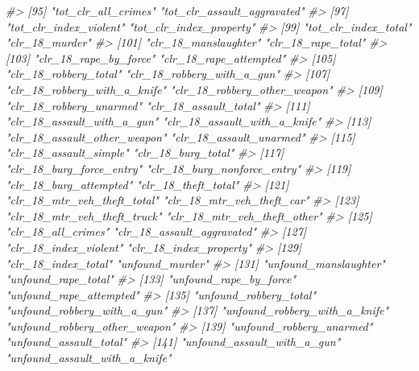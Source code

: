 \documentclass[
  12pt,
]{book}
\newenvironment{Shaded}{\begin{snugshade}}{\end{snugshade}}
\newcommand{\CommentTok}[1]{\textcolor[rgb]{0.37,0.37,0.37}{\textit{#1}}}
\begin{document}
\begin{Shaded}
\begin{Highlighting}[]
\CommentTok{\#\textgreater{}  [95] "tot\_clr\_all\_crimes"             "tot\_clr\_assault\_aggravated"    }
\CommentTok{\#\textgreater{}  [97] "tot\_clr\_index\_violent"          "tot\_clr\_index\_property"        }
\CommentTok{\#\textgreater{}  [99] "tot\_clr\_index\_total"            "clr\_18\_murder"                 }
\CommentTok{\#\textgreater{} [101] "clr\_18\_manslaughter"            "clr\_18\_rape\_total"             }
\CommentTok{\#\textgreater{} [103] "clr\_18\_rape\_by\_force"           "clr\_18\_rape\_attempted"         }
\CommentTok{\#\textgreater{} [105] "clr\_18\_robbery\_total"           "clr\_18\_robbery\_with\_a\_gun"     }
\CommentTok{\#\textgreater{} [107] "clr\_18\_robbery\_with\_a\_knife"    "clr\_18\_robbery\_other\_weapon"   }
\CommentTok{\#\textgreater{} [109] "clr\_18\_robbery\_unarmed"         "clr\_18\_assault\_total"          }
\CommentTok{\#\textgreater{} [111] "clr\_18\_assault\_with\_a\_gun"      "clr\_18\_assault\_with\_a\_knife"   }
\CommentTok{\#\textgreater{} [113] "clr\_18\_assault\_other\_weapon"    "clr\_18\_assault\_unarmed"        }
\CommentTok{\#\textgreater{} [115] "clr\_18\_assault\_simple"          "clr\_18\_burg\_total"             }
\CommentTok{\#\textgreater{} [117] "clr\_18\_burg\_force\_entry"        "clr\_18\_burg\_nonforce\_entry"    }
\CommentTok{\#\textgreater{} [119] "clr\_18\_burg\_attempted"          "clr\_18\_theft\_total"            }
\CommentTok{\#\textgreater{} [121] "clr\_18\_mtr\_veh\_theft\_total"     "clr\_18\_mtr\_veh\_theft\_car"      }
\CommentTok{\#\textgreater{} [123] "clr\_18\_mtr\_veh\_theft\_truck"     "clr\_18\_mtr\_veh\_theft\_other"    }
\CommentTok{\#\textgreater{} [125] "clr\_18\_all\_crimes"              "clr\_18\_assault\_aggravated"     }
\CommentTok{\#\textgreater{} [127] "clr\_18\_index\_violent"           "clr\_18\_index\_property"         }
\CommentTok{\#\textgreater{} [129] "clr\_18\_index\_total"             "unfound\_murder"                }
\CommentTok{\#\textgreater{} [131] "unfound\_manslaughter"           "unfound\_rape\_total"            }
\CommentTok{\#\textgreater{} [133] "unfound\_rape\_by\_force"          "unfound\_rape\_attempted"        }
\CommentTok{\#\textgreater{} [135] "unfound\_robbery\_total"          "unfound\_robbery\_with\_a\_gun"    }
\CommentTok{\#\textgreater{} [137] "unfound\_robbery\_with\_a\_knife"   "unfound\_robbery\_other\_weapon"  }
\CommentTok{\#\textgreater{} [139] "unfound\_robbery\_unarmed"        "unfound\_assault\_total"         }
\CommentTok{\#\textgreater{} [141] "unfound\_assault\_with\_a\_gun"     "unfound\_assault\_with\_a\_knife"  }

\end{Highlighting}
\end{Shaded}
\end{document}
